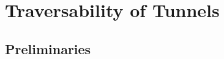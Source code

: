 \documentclass[usletter, 10pt, conference]{ieeeconf} %
\begin{document}




\section{Traversability of Tunnels}

\subsection{Preliminaries}
\end{document}

